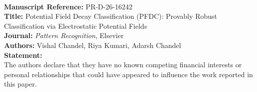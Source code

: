 \documentclass[11pt]{article}
\begin{document}
\\[1em]
\noindent\textbf{Manuscript Reference:} PR-D-26-16242\\
\textbf{Title:} Potential Field Decay Classification (PFDC): Provably Robust Classification via Electrostatic Potential Fields\\
\textbf{Journal:} \textit{Pattern Recognition}, Elsevier\\
\textbf{Authors:} Vishal Chandel, Riya Kumari, Adarsh Chandel\\[1.5em]
\noindent\textbf{Statement:}\\
The authors declare that they have no known competing financial interests or personal relationships that could have appeared to influence the work reported in this paper.
\end{document}
